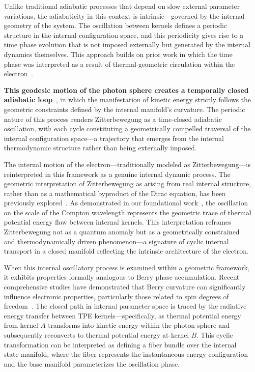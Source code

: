 \documentclass[%
 reprint,
 amsmath,amssymb,
 aps,
]{revtex4-1}
\numberwithin{equation}{section}%
\begin{document}
Unlike traditional adiabatic processes that depend on slow external parameter variations, the adiabaticity in this context is intrinsic—governed by the internal geometry of the system. The oscillation between kernels defines a periodic structure in the internal configuration space, and this periodicity gives rise to a time phase evolution that is not imposed externally but generated by the internal dynamics themselves. This approach builds on prior work in which the time phase was interpreted as a result of thermal-geometric circulation within the electron~\cite{hanamura2411.0117}.

\textbf{This geodesic motion of the photon sphere creates a temporally closed adiabatic loop}~\cite{hanamura2507.0128}, in which the manifestation of kinetic energy strictly follows the geometric constraints defined by the internal manifold’s curvature. The periodic nature of this process renders Zitterbewegung as a time-closed adiabatic oscillation, with each cycle constituting a geometrically compelled traversal of the internal configuration space—a trajectory that emerges from the internal thermodynamic structure rather than being externally imposed.

The internal motion of the electron—traditionally modeled as Zitterbewegung—is reinterpreted in this framework as a genuine internal dynamic process. The geometric interpretation of Zitterbewegung as arising from real internal structure, rather than as a mathematical byproduct of the Dirac equation, has been previously explored~\cite{barut1981zitterbewegung}. As demonstrated in our foundational work~\cite{hanamura1811.0312}, the oscillation on the scale of the Compton wavelength represents the geometric trace of thermal potential energy flow between internal kernels. This interpretation reframes Zitterbewegung not as a quantum anomaly but as a geometrically constrained and thermodynamically driven phenomenon—a signature of cyclic internal transport in a closed manifold reflecting the intrinsic architecture of the electron. 

When this internal oscillatory process is examined within a geometric framework, it exhibits properties formally analogous to Berry phase accumulation. Recent comprehensive studies have demonstrated that Berry curvature can significantly influence electronic properties, particularly those related to spin degrees of freedom~\cite{xiao2010berry}. The closed path in internal parameter space is traced by the radiative energy transfer between TPE kernels—specifically, as thermal potential energy from kernel $A$ transforms into kinetic energy within the photon sphere and subsequently reconverts to thermal potential energy at kernel $B$. This cyclic transformation can be interpreted as defining a fiber bundle over the internal state manifold, where the fiber represents the instantaneous energy configuration and the base manifold parameterizes the oscillation phase.
\end{document}
